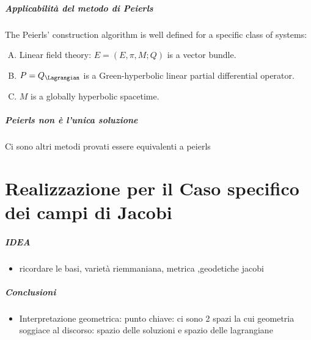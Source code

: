 \documentclass{beamer}
\begin{document}
	\begin{frame}
		\frametitle{Applicabilità del metodo di Peierls}	
			The Peierls' construction algorithm is well defined for a specific class of systems:
		\begin{enumerate}[A)]
			\item\label{HpPeierls1} Linear field theory: $E=(E,\pi,M;Q)$ is a vector bundle.
			\item\label{HpPeierls2} $P=Q_\Lagrangian$ is a Green-hyperbolic linear partial differential operator.
			\item\label{HpPeierls3} $M$ is a globally hyperbolic spacetime.
		\end{enumerate}	
	\end{frame}
	
	\begin{frame}
		\frametitle{Peierls non è l'unica soluzione}
		Ci sono altri metodi provati essere equivalenti a peierls
	
	\end{frame}
	
	
	\part{Realizzazione per il Caso specifico dei campi di Jacobi}
	\frame{\partpage}

	\begin{frame}
		\frametitle{ IDEA }
			\begin{itemize}
				\item ricordare le basi, varietà riemmaniana, metrica ,geodetiche jacobi
			\end{itemize}
	\end{frame}


	\begin{frame}
		\frametitle{ Conclusioni }
			\begin{itemize}
				\item Interpretazione geometrica: punto chiave: ci sono 2 spazi la cui geometria soggiace al discorso: spazio delle soluzioni e spazio delle lagrangiane
			\end{itemize}
	\end{frame}
	
\end{document}
